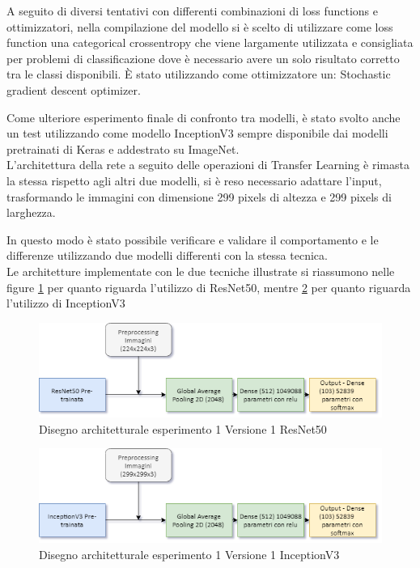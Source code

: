 A seguito di diversi tentativi con differenti combinazioni di loss functions e ottimizzatori, nella compilazione del modello si è scelto di utilizzare come loss function una categorical crossentropy \cite{categorical_crossentropy} che viene largamente utilizzata e consigliata per problemi di classificazione dove è necessario avere un solo risultato corretto tra le classi disponibili. È stato utilizzando come ottimizzatore un: Stochastic gradient descent optimizer. \bigskip

Come ulteriore esperimento finale di confronto tra modelli, è stato svolto anche un test utilizzando come modello InceptionV3 \cite{inceptionv3} sempre disponibile dai modelli pretrainati di Keras e addestrato su ImageNet. \\

L'architettura della rete a seguito delle operazioni di Transfer Learning è rimasta la stessa rispetto agli altri due modelli, si è reso necessario adattare l'input, trasformando le immagini con dimensione 299 pixels di altezza e 299 pixels di larghezza.  \bigskip

In questo modo è stato possibile verificare e validare il comportamento e le differenze utilizzando due modelli differenti con la stessa tecnica. \\

Le architetture implementate con le due tecniche illustrate si riassumono nelle figure \ref{fig:architettura-esperimento1_V1} per quanto riguarda l'utilizzo di ResNet50, mentre \ref{fig:architettura-esperimento1_V2} per quanto riguarda l'utilizzo di InceptionV3

\begin{figure}
    \centering
    \includegraphics[width=1\textwidth]{./resources/AdvanceMachineLearningSchema-Esperimento1_V1.png}
    \caption{Disegno architetturale esperimento 1 Versione 1 ResNet50} 
    \label{fig:architettura-esperimento1_V1}
\end{figure}


\begin{figure}
    \centering
    \includegraphics[width=1\textwidth]{./resources/AdvanceMachineLearningSchema-Esperimento1_V2.png}
    \caption{Disegno architetturale esperimento 1 Versione 1 InceptionV3} 
    \label{fig:architettura-esperimento1_V2}
\end{figure}

